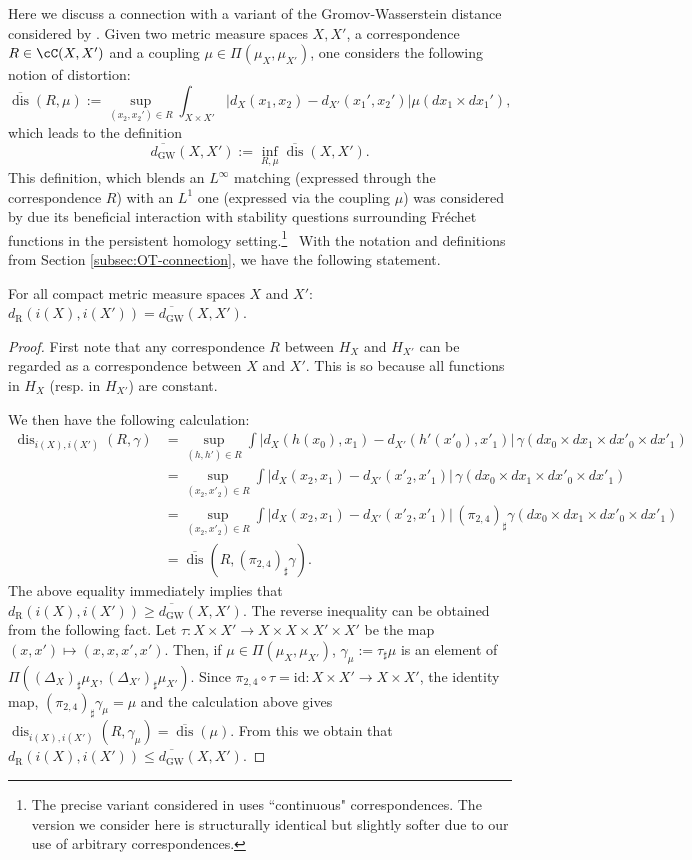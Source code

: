 \documentclass[twoside,11pt]{article}
\newcommand{\dexp}[1][]{d_{\mathrm{R}#1}}
\DeclareMathOperator{\dis}{dis}
\begin{document}
Here we discuss a connection with a variant of the Gromov-Wasserstein distance considered by \citet{hang2019topological}. Given two metric measure spaces $X,X'$, a correspondence $R\in\cC(X,X')$ and a coupling $\mu\in\Pi(\mu_X,\mu_{X'})$, one considers the following notion of distortion:
$$\overline{\dis}(R,\mu):=\sup_{(x_2,x_2')\in R}\int_{X\times X'}\big|d_X(x_1,x_2)-d_{X'}(x_1',x_2')\big|\mu(dx_1\times dx_1'),$$
which leads to the definition $$\overline{d_{\mathrm{GW}}}(X,X'):=\inf_{R,\mu} \overline{\dis}(X,X').$$ This definition, which blends an $L^\infty$ matching (expressed through the correspondence $R$) with an $L^1$ one (expressed via the coupling $\mu$) was considered by \citet{hang2019topological} due its beneficial interaction with stability questions surrounding Fr\'echet functions in the persistent homology setting.\footnote{The precise variant considered in \citep{hang2019topological} uses ``continuous" correspondences. The version we consider here is structurally identical but slightly softer due to our use of arbitrary correspondences.} 
\
With the notation and definitions from Section \ref{subsec:OT-connection}, we have the following statement.
\begin{proposition}\label{prop:conn-eq} For all compact metric measure spaces $X$ and $X'$:
$\dexp(i(X),i(X'))=\overline{d_{\mathrm{GW}}}(X,X').$
\end{proposition}
\begin{proof}
First note that any correspondence $R$ between $H_X$ and $H_{X'}$ can be regarded as a correspondence between $X$ and $X'$. This is so because all functions in $H_X$ (resp. in $H_{X'}$) are constant. 

We then have the following calculation:
\begin{align*}
       \dis_{i(X),i(X')}(R,\gamma)
        & =
        \sup_{(h,h') \in R}\int \big| d_X(h(x_0),x_1) - d_{X'}(h'(x'_0),x'_1) \big| \, \gamma(dx_0{\times} dx_1 {\times} dx'_0 {\times} dx'_1)
        \\ & =
        \sup_{(x_2,x'_2) \in R} \int \big| d_X(x_2,x_1) - d_{X'}(x'_2,x'_1) \big| \, \gamma(dx_0{\times} dx_1 {\times} dx'_0 {\times} dx'_1)
        \\ & =
        \sup_{(x_2,x'_2) \in R} \int \big| d_X(x_2,x_1) - d_{X'}(x'_2,x'_1) \big| \, (\pi_{2,4})_\sharp\gamma(dx_0{\times} dx_1 {\times} dx'_0 {\times} dx'_1) \\
        & = \overline{\dis}(R,(\pi_{2,4})_\sharp\gamma).
    \end{align*}
    The above equality immediately implies that $\dexp(i(X),i(X'))\geq \overline{d_{\mathrm{GW}}}(X,X').$ The reverse inequality can be obtained from the following fact. Let $\tau:X\times X'\to X\times X\times X'\times X'$ be the map $(x,x')\mapsto (x,x,x',x')$. Then, if $\mu \in \Pi(\mu_X,\mu_{X'})$,  $\gamma_\mu:=\tau_\sharp \mu$ is an element of $\Pi((\Delta_X)_\sharp \mu_X, (\Delta_{X'})_\sharp \mu_{X'})$. Since $\pi_{2,4}\circ \tau = \mathrm{id}:X\times X'\to X\times X'$, the identity map, $(\pi_{2,4})_\sharp \gamma_\mu = \mu$ and the calculation above gives $\dis_{i(X),i(X')}(R,\gamma_\mu)=\overline{\dis}(\mu)$. From this we obtain that $\dexp(i(X),i(X'))\leq \overline{d_{\mathrm{GW}}}(X,X').$ 
\end{proof}
\end{document}
